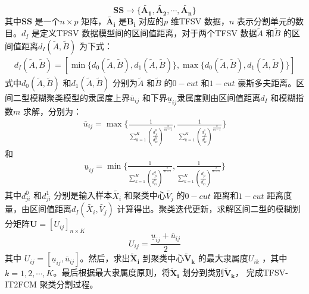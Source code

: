 \begin{equation}\label{eq:eq-2}
    \bm{SS} \to \lbrace \bm{\tilde{A_1}}, \bm{\tilde{A_2}},\bm{\cdots}, \bm{\tilde{A_n}} \rbrace
\end{equation}
其中$\bm{SS}$ 是一个$n \times p$ 矩阵，$\bm{\tilde{A_i}}$ 是$\bm{B_i}$ 对应的$p$ 维TFSV 数据，$n$ 表示分割单元的数目。$d_I$ 是定义TFSV 数据模型间的区间值距离，对于两个TFSV 数据$\tilde{A}$ 和$\tilde{B}$ 的区间值距离$d_I (\tilde{A}, \tilde{B})$ 为下式：
\begin{equation}\label{eq:interval}
    \begin{split}
        d _{I} (\tilde{A},\tilde{B}) = [\min \lbrace d_0 (\tilde{A},\tilde{B}),d_1(\tilde{A},\tilde{B}) \rbrace, \max \lbrace d_0(\tilde{A},\tilde{B}), d_1 (\tilde{A},\tilde{B}) \rbrace ]
    \end{split}
\end{equation}
式中$d_0 (\tilde{A},\tilde{B})$ 和$d_1 (\tilde{A},\tilde{B})$ 分别为$\tilde{A}$ 和$\tilde{B}$ 的$0-cut$ 和$ 1-cut$ 豪斯多夫距离\cite{zadeh1978fuzzy}。区间二型模糊聚类模型的隶属度上界$\overline{u}_{ij}$ 和下界$\underline{u}_{ij}$隶属度则由区间值距离$d _{I} $ 和模糊指数$m$ 求解，分别为：
\begin{equation}\label{eq:13}
    \begin{split}
        \overline{u}_{ij} = \max \Bigg \lbrace \frac{1}{\sum_{k=1}^K {(\frac{d_{ji}^0}{d_{ki}^0})}^{\frac{2}{m-1}}}, \frac{1}{\sum_{k=1}^K {(\frac{d_{ji}^1}{d_{ki}^1})}^{\frac{2}{m-1}}} \Bigg \rbrace
    \end{split}
\end{equation}
和
\begin{equation}\label{eq:14}
    \begin{split}
        \underline{u}_{ij} = \min \Bigg \lbrace \frac{1}{\sum_{k=1}^K {(\frac{d_{ji}^0}{d_{ki}^0})}^{\frac{2}{m-1}}}, \frac{1}{\sum_{k=1}^K {(\frac{d_{ji}^1}{d_{ki}^1})}^{\frac{2}{m-1}}} \Bigg \rbrace
    \end{split}
\end{equation}
其中$d_{ji}^0$ 和$d_{ji}^1$ 分别是输入样本$\tilde{X_i}$ 和聚类中心$\tilde{V_j}$ 的$0-cut$ 距离和$1-cut$ 距离度量，由区间值距离$d_{I} (\tilde{X_i}, \tilde{V_j})$ 计算得出。聚类迭代更新，求解区间二型的模糊划分矩阵$\bm{U} = [U_{ij}]_{n \times K}$
\begin{equation}\label{eq:21}
    U_{ij} = \frac{\underline{u}_{ij} + \overline{u}_{ij}}{2}
\end{equation}
其中 $U_{ij} = [\underline{u}_{ij}, \overline{u}_{ij}]$。然后，求出$\bm{\tilde{X}_i}$ 到聚类中心$\bm{\tilde{V}_k}$ 的最大隶属度$U_{ik}$ ，其中$k = 1, 2,\cdots, K$。最后根据最大隶属度原则，将$\bm{\tilde{X}_i}$ 划分到类别$\bm{\tilde{V}_k}$， 完成TFSV-IT2FCM 聚类分割过程。

